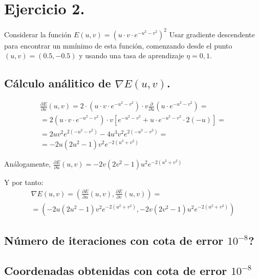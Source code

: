 \section{Ejercicio 2.}
Considerar la función $E(u, v) = \left( u \cdot v \cdot e^{ −u^2 −v^2 } \right) ^2$
Usar gradiente descendente para encontrar un mmínimo de esta función, comenzando
desde el punto $(u, v) = (0.5, -0.5)$ y usando una tasa de aprendizaje $\eta = 0,1$.

\subsection{Cálculo análitico de $\nabla E(u, v)$.}


\begin{equation*}
\begin{aligned}
  \frac{\partial{E}}{\partial u}(u,v) = 2 \cdot (u \cdot v \cdot e^{-u^2 - v^2}) 
  \cdot v \frac{\partial}{\partial u} \left( u \cdot e^{-u^2 - v^2} \right) = \\
  = 2(u\cdot v\cdot e^{-u^2 - v^2}) \cdot v \left[ e^{-u^2 - v^2} + u\cdot e^{-u^2 - v^2} \cdot 2(-u) \right] = \\
  = 2uv^2e^{2(-u^2-v^2)} - 4u^3v^2e^{2(-u^2-v^2)} = \\
  = -2u (2u^2 - 1) v^2 e^{-2(u^2+v^2)}
\end{aligned}
\end{equation*}

Análogamente, $\frac{\partial{E}}{\partial u}(u,v) = -2v (2v^2 - 1) u^2 e^{-2(u^2+v^2)}$

Y por tanto:
\begin{equation}
  \begin{aligned}
    \nabla{E}(u,v) = \left(\frac{\partial E}{\partial u}(u,v), \frac{\partial E}{\partial v}(u,v) \right ) = \\
    = \left( -2u (2u^2 - 1) v^2 e^{-2(u^2+v^2)}, -2v (2v^2 - 1) u^2 e^{-2(u^2+v^2)} \right)
  \end{aligned}
\end{equation}


\subsection{Número de iteraciones con cota de error $10^{-8}$?}
\subsection{Coordenadas obtenidas con cota de error $10^{-8}$}


